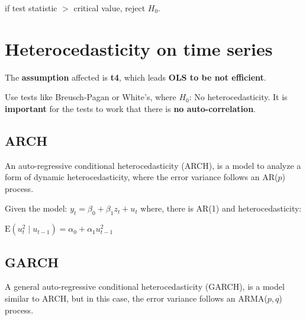 \documentclass[10pt, a4paper, landscape]{article}
\newcommand{\E}{\mathrm{E}}
\begin{document}
\begin{multicols}{3}
\begin{enumerate}[leftmargin=*]
			if test statistic $>$ critical value, reject $H_0$.
		\end{enumerate}
		
		\section*{Heterocedasticity on time series}
		
		The \textbf{assumption} affected is \textbf{t4}, which leads \textbf{OLS to be not efficient}.
		
		Use tests like Breusch-Pagan or White's, where $H_{0}$: No heterocedasticity. It is \textbf{important} for the tests to work that there is \textbf{no auto-correlation}.
		
		\subsection*{ARCH}
		
		An auto-regressive conditional heterocedasticity (ARCH), is a model to analyze a form of dynamic heterocedasticity, where the error variance follows an AR($p$) process.
		
		Given the model: $y_{t} = \beta_{0} + \beta_{1} z_{t} + u_{t}$ where, there is AR(1) and heterocedasticity:
		
		\begin{center}
			$\E(u^{2}_{t} \mid u_{t - 1}) = \alpha_{0} + \alpha_{1} u^{2}_{t - 1}$
		\end{center}
		
		\subsection*{GARCH}
		
		A general auto-regressive conditional heterocedasticity (GARCH), is a model similar to ARCH, but in this case, the error variance follows an ARMA($p, q$) process.
	\end{multicols}
\end{document}
